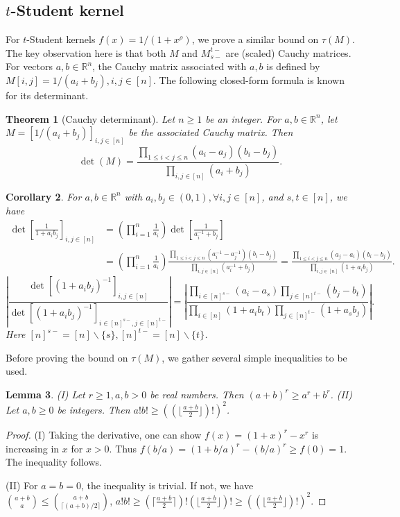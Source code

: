 \documentclass[10pt,a4paper]{article}
\newtheorem{theorem}{Theorem}
\newtheorem{corollary}[theorem]{Corollary}
\newtheorem{lemma}[theorem]{Lemma}
\theoremstyle{remark}
\numberwithin{equation}{section}
\numberwithin{theorem}{section}
\newcommand{\R}{\ensuremath{\mathbb{R}}}
\begin{document}
\subsection{$t$-Student kernel}
For $t$-Student kernels $f(x) = 1/(1 + x^\rho)$, we prove a similar bound on $\tau(M)$. The key observation here is that both $M$ and $M_{s-}^{t-}$ are (scaled) Cauchy matrices. For vectors $a, b \in \R^n$, the Cauchy matrix associated with $a, b$ is defined by $M[i, j] = 1/(a_i + b_j), i, j \in [n]$. The following closed-form formula is known for its determinant.
\begin{theorem}[Cauchy determinant]
Let $n \ge 1$ be an integer. For $a, b \in \R^{n}$, let $M = [1/(a_i + b_j)]_{i, j \in [n]}$ be the associated Cauchy matrix. Then
\[\det(M) = \frac{\prod_{1 \le i < j \le n}(a_i - a_j)(b_i - b_j)}
{\prod_{i, j \in [n]}(a_i + b_j)}.\]
\end{theorem}
\begin{corollary}\label{cor:cauchyratio}
For $a, b \in \R^n$ with $a_i, b_j \in (0, 1), \forall i, j \in [n]$, 
and $s, t \in [n]$, we have
\begin{align*}\det\left[\frac1{1+a_ib_j}\right]_{i, j \in [n]}
&= \left(\prod_{i=1}^n \frac1{a_i}\right)\det\left[\frac1{a_i^{-1}+b_j}\right] \\
&= \left(\prod_{i=1}^n \frac1{a_i}\right)
\frac{\prod_{1 \le i < j \le n}(a_i^{-1} - a_j^{-1})(b_i - b_j)}
{\prod_{i, j \in [n]}(a_i^{-1} + b_j)} 
= \frac{\prod_{1 \le i < j \le n}(a_j - a_i)(b_i - b_j)}
{\prod_{i, j \in [n]}(1 + a_ib_j)}.
\end{align*}
\[\left|\frac{\det[(1+a_ib_j)^{-1}]_{i, j \in [n]}}
{\det[(1+a_ib_j)^{-1}]_{i \in [n]^{s-}, j \in [n]^{t-}}}\right|
= \left|\frac{\prod_{i\in [n]^{s-}}(a_i - a_s)\prod_{j\in [n]^{t-}}(b_j - b_t)}
{\prod_{i \in [n]}(1 + a_ib_t)\prod_{j \in [n]^{t-}}(1 + a_sb_j)}\right|.\]
Here $[n]^{s-} = [n] \backslash\{s\}, [n]^{t-} = [n] \backslash \{t\}$.
\end{corollary}
Before proving the bound on $\tau(M)$, we gather several simple inequalities to be used.
\begin{lemma} 
(I) Let $r \ge 1, a, b > 0$ be real numbers. Then $(a+b)^r \ge a^r + b^r$.
(II) Let $a, b \ge 0$ be integers. Then $a!b! \ge ((\lfloor\frac{a+b}2\rfloor)!)^2$. 
\end{lemma}
\begin{proof}
(I) Taking the derivative, one can show $f(x) = (1 + x)^r - x^r$ is increasing in $x$ for $x > 0$.
Thus $f(b/a) = (1 + b/a)^r - (b/a)^r \ge f(0) = 1$. The inequality follows.

(II) For $a = b = 0$, the inequality is trivial. If not, we have 
$\binom{a+b}{a} \le \binom{a+b}{\lceil(a+b)/2\rceil}$, $a!b! \ge 
(\lceil\frac{a+b}2\rceil)!(\lfloor\frac{a+b}2\rfloor)! \ge ((\lfloor\frac{a+b}2\rfloor)!)^2$.
\end{proof}
\end{document}

